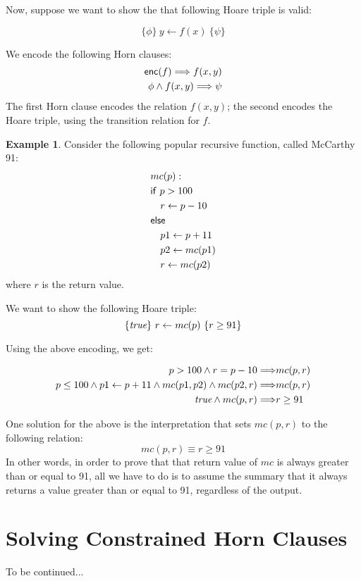 \documentclass{amsart}
\theoremstyle{definition}
\newtheorem{example}[theorem]{Example}
\theoremstyle{remark}
\numberwithin{equation}{section}
\begin{document}
Now, suppose we want to show the that following
Hoare triple is valid:

$$ \{ \phi \} \ y \gets f(x) \ \{ \psi \}$$

We encode the following Horn clauses:
\begin{align*}
\mathsf{enc}(f) \Longrightarrow f(x,y)  \\
\phi \land f(x,y) \Longrightarrow \psi
\end{align*}
The first Horn clause encodes the relation $f(x,y)$;
the second encodes the Hoare triple, using the transition relation for
$f$.

\begin{example}
Consider the following popular recursive function, called McCarthy 91:
\begin{align*}
& mc(p):\\
& \mathsf{if}\ p > 100\\
& \ \ \ r \gets p - 10\\
& \mathsf{else}\\
& \ \ \ p1 \gets p + 11\\
& \ \ \ p2 \gets mc(p1)\\
& \ \ \ r \gets mc(p2)
\end{align*}
where $r$ is the return value.

We want to show the following Hoare triple:
$$\{\emph{true}\} \ r \gets mc(p) \ \{r \geq 91\}$$

Using the above encoding, we get:

\begin{align*}
p > 100 \land r = p - 10 \Longrightarrow& mc(p,r)\\
p \leq 100 \land p1 \gets p + 11 \land mc(p1,p2) \land mc(p2,r) \Longrightarrow& mc(p,r)\\
\emph{true} \land mc(p,r) \Longrightarrow& r \geq 91
\end{align*}

One solution for the above is the interpretation that
sets $mc(p,r)$ to the following relation:
$$ mc(p,r) \equiv r \geq 91$$
In other words, in order to prove that that return value of
$mc$ is always greater than or equal to 91, all we have to do
is to assume the summary that it always returns a value greater than
or equal to 91, regardless of the output.

\end{example}

\section{Solving Constrained Horn Clauses}
To be continued...
\end{document}
